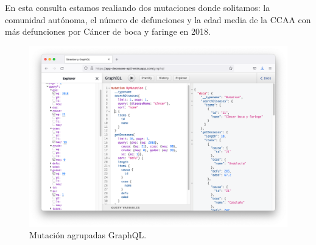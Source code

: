 En esta consulta estamos realiando dos mutaciones donde solitamos: la comunidad autónoma,
el número de defunciones y la edad media de la CCAA con más defunciones por Cáncer de boca
y faringe en 2018.
\FloatBarrier
\begin{figure}[h]
	\centering
	\includegraphics[width=\textwidth]{doc/logos/imgs/ejemplo5.png}
	\caption{ Mutación agrupadas GraphQL. }
\end{figure}
\FloatBarrier
